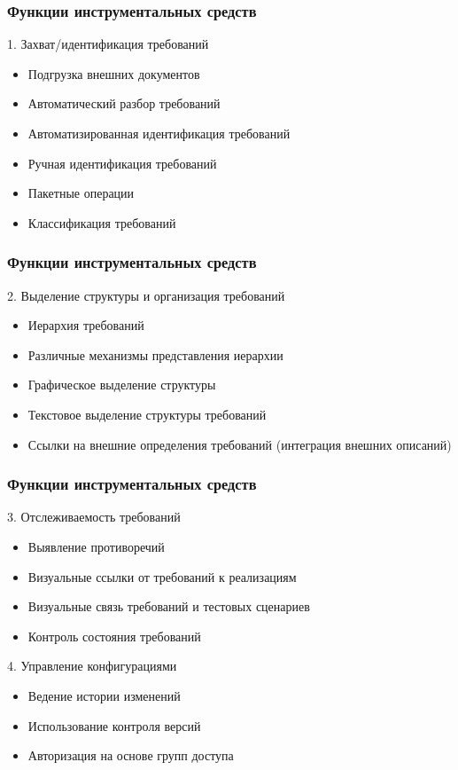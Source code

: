 \documentclass{../industrial-development}
\begin{document}
\begin{frame} \frametitle{Функции инструментальных средств}
1. Захват/идентификация требований
	\begin{itemize}
\item Подгрузка внешних документов
\item Автоматический разбор требований
\item Автоматизированная идентификация требований
\item Ручная идентификация требований
\item Пакетные операции
\item Классификация требований
  	\end{itemize}
\end{frame}


\begin{frame} \frametitle{Функции инструментальных средств}
2. Выделение структуры и организация требований
	\begin{itemize}
\item Иерархия требований
\item Различные механизмы представления иерархии
\item Графическое выделение структуры
\item Текстовое выделение структуры требований
\item Ссылки на внешние определения требований (интеграция внешних описаний)
  	\end{itemize}
\end{frame}


\begin{frame} \frametitle{Функции инструментальных средств}
3. Отслеживаемость требований
	\begin{itemize}
\item Выявление противоречий
\item Визуальные ссылки от требований к реализациям
\item Визуальные связь требований и тестовых сценариев
\item Контроль состояния требований
  	\end{itemize}
4. Управление конфигурациями
	\begin{itemize}
\item Ведение истории изменений
\item Использование контроля версий
\item Авторизация на основе групп доступа
  	\end{itemize}
\end{frame}
\end{document}
